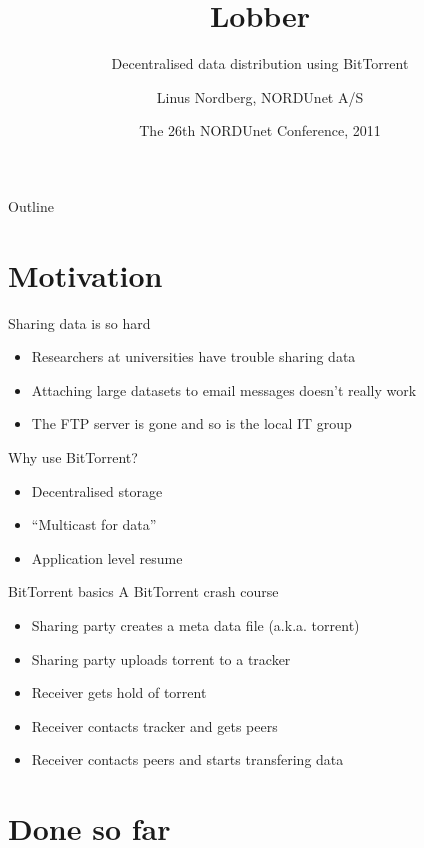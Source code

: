 \documentclass{beamer}
\title
{Lobber}
\subtitle
{Decentralised data distribution using BitTorrent}
\author
{Linus Nordberg, NORDUnet A/S}
\date[NDN 2011]
{The 26th NORDUnet Conference, 2011}
\begin{document}
\begin{frame}
  \titlepage
\end{frame}
\begin{frame}{Outline}
  \tableofcontents
\end{frame}
\section{Motivation}

\begin{frame}{Sharing data is so hard}
  \begin{itemize}
  \item
    Researchers at universities have trouble sharing data
  \item
    Attaching large datasets to email messages doesn't really work
  \item
    The FTP server is gone and so is the local IT group
  \end{itemize}
\end{frame}

\begin{frame}{Why use BitTorrent?}
  \begin{itemize}
  \item
    Decentralised storage
  \item
    ``Multicast for data''
  \item
    Application level resume
  \end{itemize}
\end{frame}

\begin{frame}{BitTorrent basics}
  A BitTorrent crash course
  \begin{itemize}
  \item
    Sharing party creates a meta data file (a.k.a. torrent)
  \item
    Sharing party uploads torrent to a tracker
  \item
    Receiver gets hold of torrent
  \item
    Receiver contacts tracker and gets peers
  \item
    Receiver contacts peers and starts transfering data
  \end{itemize}
\end{frame}
\section{Done so far}
\end{document}
